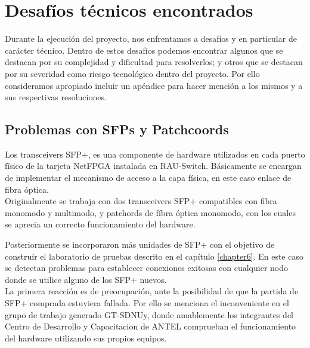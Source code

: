 
\chapter{Desaf\'ios t\'ecnicos encontrados}

\ifpdf
    \graphicspath{{Appendix2/Figs/Raster/}{Appendix2/Figs/PDF/}{Appendix2/Figs/}}
\else
    \graphicspath{{Appendix2/Figs/Vector/}{Appendix2/Figs/}}
\fi

Durante la ejecuci\'on del proyecto, nos enfrentamos a desaf\'ios y en particular de carácter t\'ecnico. Dentro de estos desaf\'ios podemos encontrar algunos que se destacan por su complejidad y dificultad para resolverlos; y otros que se destacan por su severidad como riesgo tecnol\'ogico dentro del proyecto. Por ello consideramos apropiado incluir un ap\'endice para hacer menci\'on a los mismos y a sus respectivas resoluciones.

\section{Problemas con SFPs y Patchcoords}

Los transceivers SFP+, es una componente de hardware utilizados en cada puerto f\'isico de la tarjeta NetFPGA instalada en RAU-Switch. Básicamente se encargan de implementar el mecanismo de acceso a la capa f\'isica, en este caso enlace de fibra \'optica.\\ 
 
Originalmente se trabaja con dos transceivers SFP+ compatibles con fibra monomodo y multimodo, y patchords de f\'ibra \'optica monomodo, con los cuales se aprecia un correcto funcionamiento del hardware. 

Posteriormente se incorporaron m\'as unidades de SFP+ con el objetivo de constru\'ir el laboratorio de pruebas descrito en el cap\'itulo \ref{chapter6}. En este caso se detectan problemas para establecer conexiones exitosas con cualquier nodo donde se utilice alguno de los SFP+ nuevos.\\

La primera reacci\'on es de preocupación, ante la posibilidad de que la partida de SFP+ comprada estuviera fallada. Por ello se menciona el inconveniente en el grupo de trabajo generado GT-SDNUy, donde amablemente los integrantes del Centro de Desarrollo y Capacitacion de ANTEL comprueban el funcionamiento del hardware utilizando sus propios equipos.

